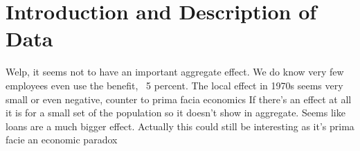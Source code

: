 \documentclass[review]{elsarticle}
\begin{document}
\pagebreak
\linenumbers
        
        \section{Introduction and Description of Data}








        Welp, it seems not to have an important aggregate effect.
        We do know very few employees even use the benefit, ~5 percent.
        The local effect in 1970s seems very small or even negative, counter to prima facia economics
        If there's an effect at all it is for a small set of the population so it doesn't show in aggregate.
        Seems like loans are a much bigger effect.
        Actually this could still be interesting as it's prima facie an economic paradox
\end{document}
